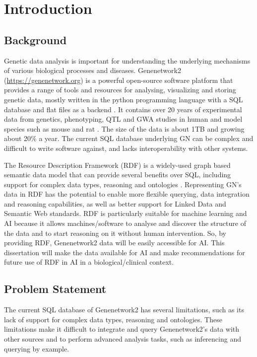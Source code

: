 \chapter{Introduction}
\label{chap:Introduction}
\section{Background}
Genetic data analysis is important for understanding the underlying mechanisms of various biological processes and diseases.  Genenetwork2 (\url{https://genenetwork.org}) is a powerful open-source software platform that provides a range of tools and resources for analysing, visualizing and storing genetic data, mostly written in the python programming language with a SQL database and flat files as a backend \citetext{\citealp{sloan2016genenetwork}; \citealp*{mulligan2017genenetwork}}.  It contains over 20 years of experimental data from genetics, phenotyping, QTL and GWA studies in human and model species such as mouse and rat \citep{sloan2016genenetwork}.  The size of the data is about 1TB and growing about 20\% a year.  The current SQL database underlying GN can be complex and difficult to write software against, and lacks interoperability with other systems.

The Resource Description Framework (RDF) is a widely-used graph based semantic data model that can provide several benefits over SQL, including support for complex data types, reasoning and ontologies \citep*{candan2001resource,allemang2011semantic}.  Representing GN's data in RDF has the potential to enable more flexible querying, data integration and reasoning capabilities, as well as better support for Linked Data and Semantic Web standards.  RDF is particularly suitable for machine learning and AI because it allows machines/software to analyse and discover the structure of the data and to start reasoning on it without human intervention.  So, by providing RDF, Genenetwork2 data will be easily accessible for AI.  This dissertation will make the data available for AI and make recommendations for future use of RDF in AI in a biological/clinical context.

\section{Problem Statement}

The current SQL database of Genenetwork2 has several limitations, such as its lack of support for complex data types, reasoning and ontologies.  These limitations make it difficult to integrate and query Genenetwork2's data with other sources and to perform advanced analysis tasks, such as inferencing and querying by example.

